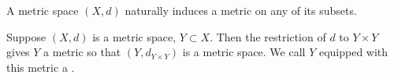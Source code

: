 \begin{comment}
Conversely one can show that a metric with these two additional properties does come from a norm, an exercise we leave to the reader. [Hint: the norm must arise as $\norm{v}=d(v,0)$.]
\end{remark}

We call a vector space endowed with a norm $\norm{\cdot}$ a \vocab{normed space}. Whenever we talk about normed spaces it is understood that we are also thinking of them as metric spaces, with the metric being defined by $d(v,w)=\norm{v-w}$.

Note that we do not assume that the underlying vector space $V$ is finite dimensional. Here are some examples which are not finite-dimensional (whilst we do not prove that they are not finite-dimensional here, it is not hard to do so and we suggest this as an exercise).

\begin{example}[$\ell^p$ spaces]
Let
\begin{align*}
\ell_1&=\crbrac{(x_n)_{n=1}^\infty\:\bigg|\:\sum_{n\ge1}|x_n|<\infty},\\
\ell_2&=\crbrac{(x_n)_{n=1}^\infty\:\bigg|\:\sum_{n\ge1}x_n^2<\infty},\\
\ell_\infty=&\crbrac{(x_n)_{n=1}^\infty\:\bigg|\:\sup_{n\in\NN}|x_n|<\infty}.
\end{align*}
The sets $\ell_1$, $\ell_2$, $\ell_\infty$ are all real vector spaces, and moreover
\begin{align*}
\norm{(x_n)}_1&=\sum_{n\ge1}|x_n|,\\
\norm{(x_n)}_2&=\brac{\sum_{n\ge1}x_n^2}^\frac{1}{2},\\
\norm{(x_n)}_\infty&=\sup_{n\in\NN}|x_n|
\end{align*}
define norms on $\ell_1$, $\ell_2$ and $\ell_\infty$ respectively.

Note that $\ell_2$ is in fact an inner product space where
\[\langle(x_n),(y_n)\rangle=\sum_{n\ge1}x_ny_n,\]
(the fact that the right-hand side converges if $(x_n)$ and $(y_n)$ are in $\ell_2$ follows from the Cauchy--Schwarz inequality). The space $\ell^2$ is known as \vocab{Hilbert space}.
\end{example}
\end{comment}

A metric space $(X,d)$ naturally induces a metric on any of its subsets.

\begin{definition}[Subspace]
Suppose $(X,d)$ is a metric space, $Y\subset X$. Then the restriction of $d$ to $Y\times Y$ gives $Y$ a metric so that $(Y,d_{Y\times Y})$ is a metric space. We call $Y$ equipped with this metric a .
\end{definition}

